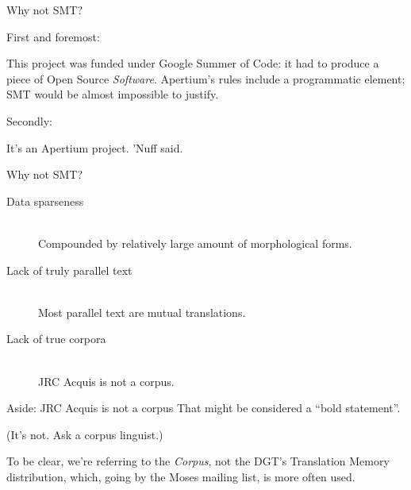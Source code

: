 \documentclass{beamer}
\begin{document}
\begin{frame}{Why not SMT?}

First and foremost:

This project was funded under Google Summer of Code: it had to produce a piece
of Open Source {\em Software}. Apertium's rules include a programmatic element;
SMT would be almost impossible to justify.

\pause

Secondly:

It's an Apertium project. 'Nuff said.

\end{frame}

\begin{frame}{Why not SMT?}
\begin{description}
  \item[Data sparseness] \hfill \\
  Compounded by relatively large amount of morphological forms.
  \item[Lack of truly parallel text] \hfill \\
  Most parallel text are mutual translations.
  \item[Lack of true corpora] \hfill \\
  JRC Acquis is not a corpus.
\end{description}

\end{frame}

\begin{frame}{Aside: JRC Acquis is not a corpus}
That might be considered a ``bold statement''.

(It's not. Ask a corpus linguist.)

\hbox{}

{\footnotesize To be clear, we're referring to the {\em Corpus}, not the DGT's Translation
Memory distribution, which, going by the Moses mailing list, is more often
used.}
\end{frame}
\end{document}
